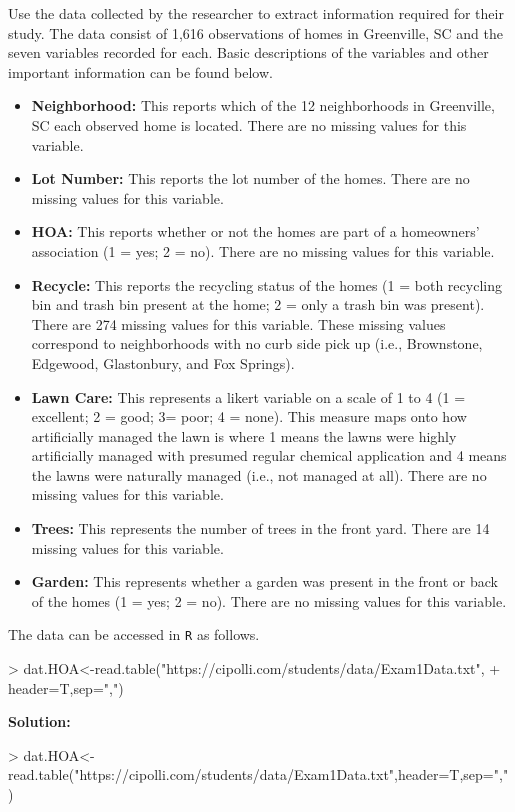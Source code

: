 \documentclass{article}
\begin{document}
Use the data collected by the researcher to extract information required for their study. The data consist of 1,616 observations of homes in Greenville, SC and the seven variables recorded for each. 
Basic descriptions of the variables and other important information can be found below.
\begin{itemize}
\item \textbf{Neighborhood:} This reports which of the 12 neighborhoods in Greenville, SC each observed home is located. There are no missing values for this variable. 
\item \textbf{Lot Number:} This reports the lot number of the homes. There are no missing values for this variable. 
\item \textbf{HOA:} This reports whether or not the homes are part of a homeowners' association (1 = yes; 2 = no). There are no missing values for this variable.
\item \textbf{Recycle:} This reports the recycling status of the homes (1 = both recycling bin and trash bin present at the home; 2 = only a trash bin was present). There are 274 missing values for this variable. These missing values correspond to neighborhoods with no curb side pick up (i.e., Brownstone, Edgewood, Glastonbury, and Fox Springs).
\item \textbf{Lawn Care:} This represents a likert variable on a scale of 1 to 4 (1 = excellent; 2 = good; 3= poor; 4 = none). This measure
maps onto how artificially managed the lawn is where 1 means the lawns were highly artificially managed with presumed regular chemical application and 4 means the lawns were naturally managed (i.e., not managed at all). There are no missing values for this variable.
\item \textbf{Trees:} This represents the number of trees in the front yard. There are 14 missing values for this variable. 
\item \textbf{Garden:} This represents whether a garden was present in the front or back of the homes (1 = yes; 2 = no). There are no missing values for this variable.
\end{itemize}
The data can be accessed in \texttt{R} as follows.
\begin{Schunk}
\begin{Sinput}
> dat.HOA<-read.table("https://cipolli.com/students/data/Exam1Data.txt",
+               header=T,sep=",")
\end{Sinput}
\end{Schunk}
\textbf{Solution:}
\begin{Schunk}
\begin{Sinput}
> dat.HOA<-read.table("https://cipolli.com/students/data/Exam1Data.txt",header=T,sep=",")
\end{Sinput}
\end{Schunk}
\end{document}

